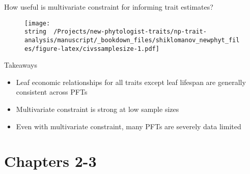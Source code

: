 \documentclass{beamer}
\begin{document}
\begin{frame}{How useful is multivariate constraint for informing trait estimates?}
  \begin{figure}
    \texttt{[image: \\string ~/Projects/new-phytologist-traits/np-trait-analysis/manuscript/\_bookdown\_files/shiklomanov\_newphyt\_files/figure-latex/civssamplesize-1.pdf]}
  \end{figure}
\end{frame}

\begin{frame}{Takeaways}
  \begin{itemize}
  \item<2-> Leaf economic relationships for all traits except leaf lifespan are
    generally consistent across PFTs
    \item<3-> Multivariate constraint is strong at low sample sizes
    \item<4-> Even with multivariate constraint, many PFTs are severely data limited
  \end{itemize}
\end{frame}

\section{Chapters 2-3}

\end{document}

